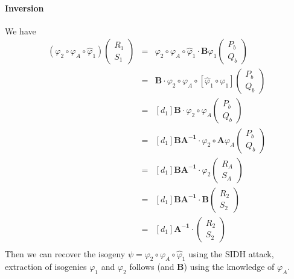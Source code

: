 \documentclass[12pt,a4paper]{article}
\begin{document}
		\paragraph{Inversion} We have
		\begin{eqnarray*}
			(\varphi_2\circ\varphi_A\circ\widehat\varphi_1)\begin{pmatrix}R_1\\S_1\end{pmatrix} 
		&=&\varphi_2\circ\varphi_A\circ\widehat\varphi_1\cdot\mathbf B\varphi_1
		\begin{pmatrix} P_b \\ Q_b \end{pmatrix}  \\
		&=& \mathbf B \cdot\varphi_2\circ\varphi_A\circ[\widehat\varphi_1\circ\varphi_1]
		\begin{pmatrix} P_b \\ Q_b \end{pmatrix} \\
		&=&[d_1] \mathbf B\cdot\varphi_2\circ\varphi_A\begin{pmatrix} P_b \\ Q_b \end{pmatrix} \\
		&=&[d_1] \mathbf{BA^{-1}}\cdot\varphi_2\circ\mathbf A\varphi_A
		\begin{pmatrix} P_b \\ Q_b \end{pmatrix} \\
		&=&[d_1] \mathbf{BA^{-1}}\cdot\varphi_2
		\begin{pmatrix} R_A \\ S_A \end{pmatrix} \\
		&=&[d_1] \mathbf{BA^{-1}}\cdot\mathbf{B}
		\begin{pmatrix} R_2 \\ S_2 \end{pmatrix} \\
		&=&[d_1] \mathbf{A^{-1}}\cdot\begin{pmatrix} R_2 \\ S_2 \end{pmatrix} \\
		\end{eqnarray*}
		Then we can recover the isogeny $\psi=\varphi_2\circ\varphi_A\circ\widehat\varphi_1$
		using the SIDH attack, extraction of isogenies  $\varphi_1$ and $\varphi_2$ follows
		(and $\mathbf B$) using the knowledge of $\varphi_A$.
\end{document}
